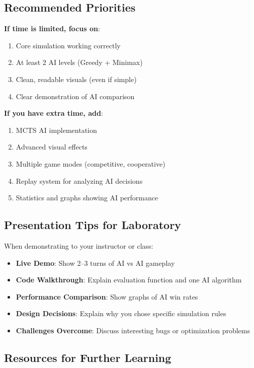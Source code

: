 \documentclass[12pt,a4paper]{article}
\begin{document}
\subsection{Recommended Priorities}

\textbf{If time is limited, focus on}:
\begin{enumerate}
    \item Core simulation working correctly
    \item At least 2 AI levels (Greedy + Minimax)
    \item Clean, readable visuals (even if simple)
    \item Clear demonstration of AI comparison
\end{enumerate}

\textbf{If you have extra time, add}:
\begin{enumerate}
    \item MCTS AI implementation
    \item Advanced visual effects
    \item Multiple game modes (competitive, cooperative)
    \item Replay system for analyzing AI decisions
    \item Statistics and graphs showing AI performance
\end{enumerate}

\subsection{Presentation Tips for Laboratory}

When demonstrating to your instructor or class:

\begin{itemize}
    \item \textbf{Live Demo}: Show 2--3 turns of AI vs AI gameplay
    \item \textbf{Code Walkthrough}: Explain evaluation function and one AI algorithm
    \item \textbf{Performance Comparison}: Show graphs of AI win rates
    \item \textbf{Design Decisions}: Explain why you chose specific simulation rules
    \item \textbf{Challenges Overcome}: Discuss interesting bugs or optimization problems
\end{itemize}

\subsection{Resources for Further Learning}
\end{document}
